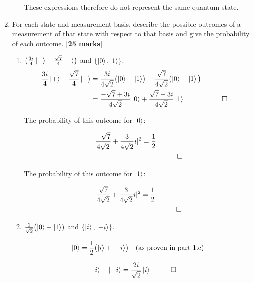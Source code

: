 \documentclass{article}
\begin{document}
\begin{enumerate}
\begin{enumerate}
These expressions therefore do not represent the same quantum state.

\end{enumerate}

	\item \label{ex2} For each state and measurement basis, describe the possible outcomes
	of a measurement of that state with respect to that basis and give the
	probability of each outcome. \hfill{\bf [25 marks]}\smallskip
	
	\begin{enumerate}

		\item $\bigl( \frac{3i}{4} \ket{+} - \frac{\sqrt{7}}{4} \ket{-} \bigr) $ and $\{\ket0, \ket1\}$.
\begin{align*}
   \frac{3i}{4} \ket{+} - \frac{\sqrt{7}}{4} \ket{-} &= \frac{3i}{4\sqrt{2}} \bigl(\ket{0} + \ket{1}\bigr) - \frac{\sqrt{7}}{4\sqrt{2}} \bigl(\ket{0} - \ket{1}\bigl) \\
    &= \frac{-\sqrt{7} + 3i}{4\sqrt{2}} \ket{0} + \frac{\sqrt{7} + 3i}{4\sqrt{2}} \ket{1}  &&\qedhere
\end{align*}

The probability of this outcome for $\ket{0}$:

\begin{align*}
  |\frac{-\sqrt{7}}{4\sqrt{2}} + \frac{3}{4\sqrt{2}}i|^2 &= \frac{1}{2} \\ &&\qedhere
\end{align*}

The probability of this outcome for $\ket{1}$:

\begin{align*}
  |\frac{\sqrt{7}}{4\sqrt{2}} + \frac{3}{4\sqrt{2}}i|^2 &= \frac{1}{2} \\ &&\qedhere
\end{align*}

		\item $ \frac{1}{\sqrt{2}} \bigl( \ket{0} - \ket{1} \bigr) $ and $\{\ket{i}, \ket{-i}\}$.

\begin{align*}
	\ket{0} = \frac{1}{2} \bigl(\ket{i} + \ket{-i}\bigr) &&\text{(as proven in part 1.c)} \\
\end{align*}

\begin{align*}
	\ket{i} - \ket{-i} &= \frac{2i}{\sqrt{2}} \ket{i} &&\qedhere
\end{align*}


\end{enumerate}
\end{enumerate}
\end{document}

